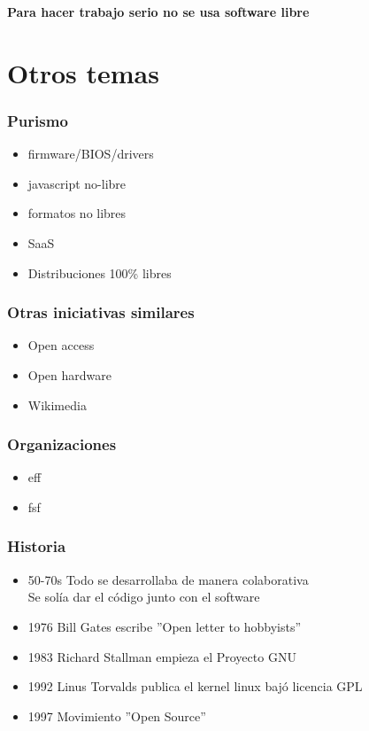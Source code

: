 \documentclass{beamer}
\begin{document}
\begin{frame}
    \begin{center}
        \textbf{Para hacer trabajo serio no se usa software libre}
    \end{center}
\end{frame}

\section{Otros temas}

\begin{frame}\frametitle{Purismo}
    \begin{itemize}
        \item firmware/BIOS/drivers \pause
        \item javascript no-libre \pause
        \item formatos no libres \pause
        \item SaaS \pause
        \item Distribuciones 100\% libres
    \end{itemize}
\end{frame}

\begin{frame}\frametitle{Otras iniciativas similares}
    \begin{itemize}
        \item Open access \pause
        \item Open hardware \pause
        \item Wikimedia
    \end{itemize}
\end{frame}

\begin{frame}\frametitle{Organizaciones}
    \begin{itemize}
        \item eff \pause
        \item fsf
    \end{itemize}
\end{frame}

\begin{frame}\frametitle{Historia}
    \begin{itemize}
        \item 50-70s Todo se desarrollaba de manera colaborativa \\ 
              Se solía dar el código junto con el software \pause
        \item 1976 Bill Gates escribe ''Open letter to hobbyists'' \pause
        \item 1983 Richard Stallman empieza el Proyecto GNU \pause
        \item 1992 Linus Torvalds publica el kernel linux bajó licencia GPL \pause
        \item 1997 Movimiento ''Open Source''
    \end{itemize}
\end{frame}
\end{document}

